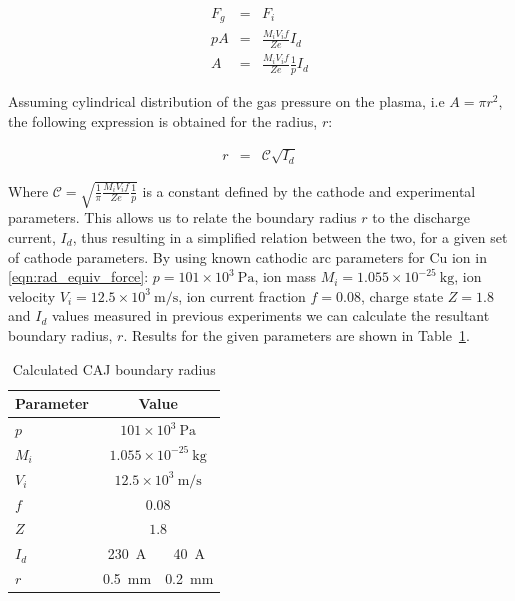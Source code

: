 \documentclass[a4paper]{iacas}%
\begin{document}
\begin{eqnarray}\label{}
	F_g & = & F_i \\\label{eqn:rel_equiv_force}
	p A & = & \frac{M_i V_i f}{Z e} I_d\\
	A & = & \frac{M_i V_i f}{Z e} \frac{1}{p} I_d
\end{eqnarray}

Assuming cylindrical distribution of the gas pressure on the plasma, i.e $A = \pi r^2$, the following expression is obtained for the radius, $r$:

\begin{eqnarray}
\label{eqn:rad_equiv_force}
	r & = & \mathcal{C}\sqrt{I_d}
\end{eqnarray}


Where $\mathcal{C} = \sqrt{\frac{1}{\pi}\frac{M_i V_i f}{Z e}\frac{1}{p}}$ is a constant defined by the cathode and experimental parameters. This allows us to relate the boundary radius $r$ to the discharge current, $I_d$, thus resulting in a simplified relation between the two, for a given set of cathode parameters. By using known cathodic arc parameters for Cu ion in \eqref{eqn:rad_equiv_force}: $p = 101 \times 10^3~\mathrm{Pa}$, ion mass $M_i = 1.055 \times 10^{-25}~\mathrm{kg}$, ion velocity $V_i = 12.5 \times 10^3~\mathrm{m/s}$, ion current fraction $f=0.08$, charge state $Z = 1.8$ and $I_d$ values measured in previous experiments \cite{KR,KRClose} we can calculate the resultant boundary radius, $r$. Results for the given parameters are shown in Table~\ref{t:radii}. 

\begin{table}[hbt]
	\begin{center}
		\begin{threeparttable}
			\caption{Calculated CAJ boundary radius}
			\label{t:radii}
			\begin{tabular}{lc|c}
				Parameter &
				\multicolumn{2}{c}{Value}\\\hline
				$p$ & \multicolumn{2}{c}{$101 \times 10^3~\mathrm{Pa} $} \\
				$M_i$  	& \multicolumn{2}{c}{$1.055 \times 10^{-25}~\mathrm{kg} $}  \\
				$V_i$ 	& \multicolumn{2}{c}{$12.5 \times 10^3~\mathrm{m/s} $}  \\
				$f$ 	& \multicolumn{2}{c}{$0.08 $} \\
				$Z$	& \multicolumn{2}{c}{$1.8 $} \\
				$I_d$  & 230~A & 40~A\\
				$r$ 	& 0.5~mm & 0.2~mm
			\end{tabular}
		\end{threeparttable}
	\end{center}
\end{table}
\end{document}
